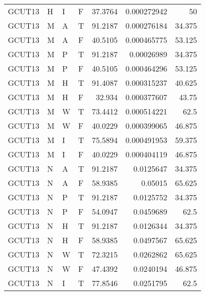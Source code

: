 \begin{longtable}{llllrrr}
    GCUT13   & H         & I         & F          & 37.3764    & 0.000272942 & 50       \\
    GCUT13   & M         & A         & T          & 91.2187    & 0.000276184 & 34.375   \\
    GCUT13   & M         & A         & F          & 40.5105    & 0.000465775 & 53.125   \\
    GCUT13   & M         & P         & T          & 91.2187    & 0.00026989  & 34.375   \\
    GCUT13   & M         & P         & F          & 40.5105    & 0.000464296 & 53.125   \\
    GCUT13   & M         & H         & T          & 91.4087    & 0.000315237 & 40.625   \\
    GCUT13   & M         & H         & F          & 32.934     & 0.000377607 & 43.75    \\
    GCUT13   & M         & W         & T          & 73.4412    & 0.000514221 & 62.5     \\
    GCUT13   & M         & W         & F          & 40.0229    & 0.000399065 & 46.875   \\
    GCUT13   & M         & I         & T          & 75.5894    & 0.000491953 & 59.375   \\
    GCUT13   & M         & I         & F          & 40.0229    & 0.000404119 & 46.875   \\
    GCUT13   & N         & A         & T          & 91.2187    & 0.0125647   & 34.375   \\
    GCUT13   & N         & A         & F          & 58.9385    & 0.05015     & 65.625   \\
    GCUT13   & N         & P         & T          & 91.2187    & 0.0125752   & 34.375   \\
    GCUT13   & N         & P         & F          & 54.0947    & 0.0459689   & 62.5     \\
    GCUT13   & N         & H         & T          & 91.2187    & 0.0126344   & 34.375   \\
    GCUT13   & N         & H         & F          & 58.9385    & 0.0497567   & 65.625   \\
    GCUT13   & N         & W         & T          & 72.3215    & 0.0262862   & 65.625   \\
    GCUT13   & N         & W         & F          & 47.4392    & 0.0240194   & 46.875   \\
    GCUT13   & N         & I         & T          & 77.8546    & 0.0251795   & 62.5     \\

\end{longtable}

